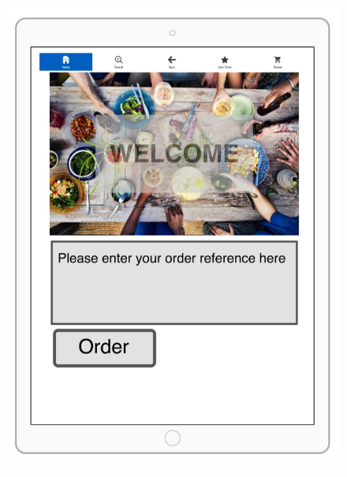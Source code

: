 \documentclass[11pt, a4paper]{report}
\begin{document}
\begin{figure}
\centering
\includegraphics[scale=0.8]{Figures/Customer1.png}
\end{figure}
\end{document}
